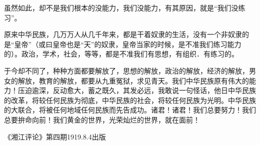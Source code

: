 虽然如此，却不是我们根本的没能力，我们没能力，有其原因，就是“我们没练习”。

原来中华民族，几万万人从几千年来，都是干着奴隶的生活，没有一个非奴隶的是“皇帝”（或曰皇帝也是“天”的奴隶，皇帝当家的时候，是不准我们练习能力的）。政治，学术，社会，等等，都是不准我们有思想，有组织．有练习的。

于今却不同了，种种方面都要解放了，思想的解放，政治的解放，经济的解放，男女的解放，教育的解放，都要从九重冤狱，求见青天。我们中华民族原有伟大的能力！压迫逾深，反动愈大，蓄之既久，其发必远，我敢说一句怪话，他日中华民族的改革，将较任何民族为彻底，中华民族的社会，将较任何民族为光明。中华民族的大联合，将被任何地域任何民族而先告成功。诸君！诸君！我们总要努力！我们总要拚命向前！我们黄金的世界，光荣灿烂的世界，就在面前！

\begin{flushright}《湘江评论》第四期1919.8.4出版\end{flushright}

